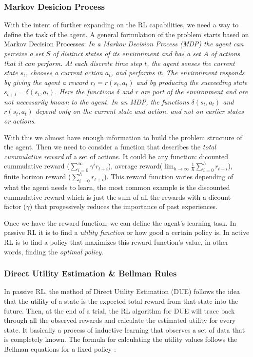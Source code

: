\subsubsection{Markov Desicion Process} \label{mdp}

With the intent of further expanding on the RL capabilities, we need a way to define the task of the agent. A general formulation of the problem starts based on Markov Decision Processes: \textit{In a Markov Decision Process (MDP) the agent can perceive a set $S$ of distinct states of its environment and has a set $A$ of actions that it can perform. At each discrete time step $t$, the agent senses the current state $s_t$, chooses a current action $a_t$, and performs it. The environment responds by giving the agent a reward $r_t = r(s_t,a_t)$ and by producing the succeeding state $s_{t+l}= \delta (s_t,a_t)$. Here the functions $\delta$ and $r$ are part of the environment and are not necessarily known to the agent. In an MDP, the functions $\delta (s_t,a_t)$ and $r(s_t,a_t)$ depend only on the current state and action, and not on earlier states or actions.}\cite[p370]{ml_tom_mitchel} 

With this we almost have enough information to build the problem structure of the agent. Then we need to consider a function that describes the  \emph{total cummulative reward} of a set of actions. It could be any function: dicounted cummulative reward ($\sum^{\infty}_{i=0}\gamma^ir_{t+i}$), average reward($\lim_{h\to\infty}\frac{1}{h}\sum^{h}_{i=0}r_{t+i}$), finite horizon reward ($\sum^{h}_{i=0}r_{t+i}$). This reward function varies depending of what the agent needs to learn, the most common example is the discounted cummulative reward which is just the sum of all the rewards with a dicount factor ($\gamma$) that progessively reduces the importance of past experiences. 

Once we have the reward function, we can define the agent's learning task. In passive RL it is to find a \emph{utility function} or how good a certain policy is. In active RL is to find a policy that maximizes this reward function's value, in other words, finding the \emph{optimal policy}.\cite{ml_tom_mitchel}


\subsubsection{Direct Utility Estimation \& Bellman Rules}

In passive RL, the method of Direct Utility Estimation (DUE) follows the idea that the utility of a state is the expected total reward from that state into the future. Then, at the end of a trial, the RL algorithm for DUE will trace back through all the observed rewards and calculate the estimated utility for every state. It basically a process of inductive learning that observes a set of data that is completely known. The formula for calculating the utility values follows the Bellman equations for a fixed policy \cite{rl}:\\

